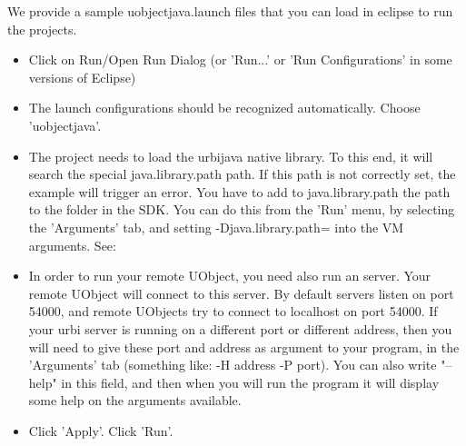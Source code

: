 We provide a sample uobjectjava.launch files that you can load in eclipse to
run the projects.

\begin{itemize}
\item Click on Run/Open Run Dialog (or 'Run...' or 'Run Configurations' in
  some versions of Eclipse)


\item The launch configurations should be recognized automatically. Choose
  'uobjectjava'.

\item The project needs to load the urbijava native library. To this end, it
  will search the special java.library.path path. If this path is not
  correctly set, the example will trigger an error.  You have to add to
  java.library.path the path to the  folder in the \urbi SDK. You
  can do this from the 'Run' menu, by selecting the 'Arguments' tab, and
  setting -Djava.library.path= into the VM
  arguments. See:


\item In order to run your remote UObject, you need also run an \urbi
  server. Your remote UObject will connect to this \urbi server. By default
  \urbi servers listen on port 54000, and remote UObjects try to connect to
  localhost on port 54000. If your urbi server is running on a different
  port or different address, then you will need to give these port and
  address as argument to your program, in the 'Arguments' tab (something
  like: -H address -P port). You can also write "--help" in this field, and
  then when you will run the program it will display some help on the
  arguments available.

\item Click 'Apply'. Click 'Run'.

\end{itemize}

